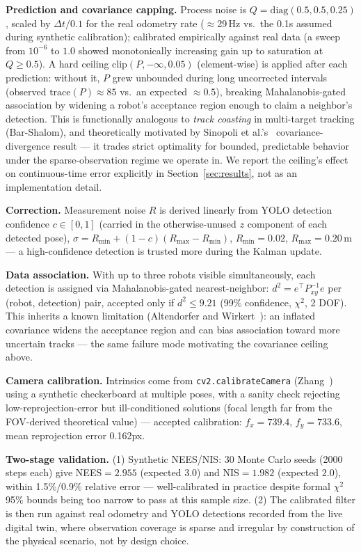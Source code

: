 \documentclass[runningheads]{llncs}
\begin{document}
\textbf{Prediction and covariance capping.} Process noise is
$Q=\mathrm{diag}(0.5,0.5,0.25)$, scaled by $\Delta t/0.1$ for the real
odometry rate ($\approx$29\,Hz vs.\ the 0.1s assumed during synthetic
calibration); calibrated empirically against real data (a sweep from
$10^{-6}$ to $1.0$ showed monotonically increasing gain up to saturation
at $Q\ge0.5$). A hard ceiling $\mathrm{clip}(P,-\infty,0.05)$
(element-wise) is applied after each prediction: without it, $P$ grew
unbounded during long uncorrected intervals (observed
$\mathrm{trace}(P)\approx85$ vs.\ an expected $\approx0.5$), breaking
Mahalanobis-gated association by widening a robot's acceptance region
enough to claim a neighbor's detection. This is functionally analogous
to \emph{track coasting} in multi-target tracking (Bar-Shalom), and
theoretically motivated by Sinopoli et
al.'s~\cite{sinopoli2004intermittent} covariance-divergence result — it
trades strict optimality for bounded, predictable behavior under the
sparse-observation regime we operate in. We report the ceiling's effect
on continuous-time error explicitly in Section~\ref{sec:results}, not as
an implementation detail.

\textbf{Correction.} Measurement noise $R$ is derived linearly from YOLO
detection confidence $c\in[0,1]$ (carried in the otherwise-unused $z$
component of each detected pose), $\sigma=R_{\min}+(1-c)(R_{\max}-R_{\min})$,
$R_{\min}=0.02$, $R_{\max}=0.20$\,m — a high-confidence detection is
trusted more during the Kalman update.

\textbf{Data association.}
\label{sec:association}
With up to three robots visible simultaneously, each detection is
assigned via Mahalanobis-gated nearest-neighbor: $d^2=e^\top P_{xy}^{-1}e$
per (robot, detection) pair, accepted only if $d^2\le9.21$ (99\%
confidence, $\chi^2$, 2 DOF). This inherits a known limitation
(Altendorfer and Wirkert~\cite{altendorfer2016association}): an inflated
covariance widens the acceptance region and can bias association toward
more uncertain tracks — the same failure mode motivating the covariance
ceiling above.

\textbf{Camera calibration.} Intrinsics come from
\texttt{cv2.calibrateCamera} (Zhang~\cite{zhang2000calibration}) using a
synthetic checkerboard at multiple poses, with a sanity check rejecting
low-reprojection-error but ill-conditioned solutions (focal length far
from the FOV-derived theoretical value) — accepted calibration:
$f_x=739.4$, $f_y=733.6$, mean reprojection error 0.162px.

\textbf{Two-stage validation.} (1) Synthetic NEES/NIS: 30 Monte Carlo
seeds (2000 steps each) give NEES$=2.955$ (expected $3.0$) and
NIS$=1.982$ (expected $2.0$), within 1.5\%/0.9\% relative error —
well-calibrated in practice despite formal $\chi^2$ 95\% bounds being
too narrow to pass at this sample size. (2) The calibrated filter is
then run against real odometry and YOLO detections recorded from the
live digital twin, where observation coverage is sparse and irregular
by construction of the physical scenario, not by design choice.
\end{document}
